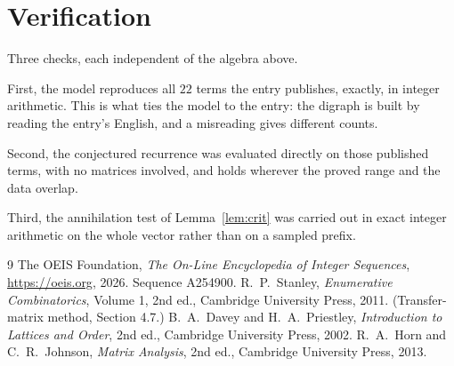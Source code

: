 \documentclass[11pt,a4paper]{article}
\theoremstyle{plain}
\theoremstyle{definition}
\begin{document}
\section{Verification}

Three checks, each independent of the algebra above.

First, the model reproduces all $22$ terms the entry publishes, exactly, in integer
arithmetic. This is what ties the model to the entry: the digraph is built by reading the
entry's English, and a misreading gives different counts.

Second, the conjectured recurrence was evaluated directly on those published terms, with no
matrices involved, and holds wherever the proved range and the data overlap.

Third, the annihilation test of Lemma~\ref{lem:crit} was carried out in exact integer
arithmetic on the whole vector rather than on a sampled prefix.

\begin{thebibliography}{9}
 The OEIS Foundation, \emph{The On-Line Encyclopedia of Integer
Sequences}, \url{https://oeis.org}, 2026. Sequence A254900.
 R.~P.~Stanley, \emph{Enumerative Combinatorics}, Volume 1, 2nd ed.,
Cambridge University Press, 2011. (Transfer-matrix method, Section 4.7.)
 B.~A.~Davey and H.~A.~Priestley, \emph{Introduction to Lattices and
Order}, 2nd ed., Cambridge University Press, 2002.
 R.~A.~Horn and C.~R.~Johnson, \emph{Matrix Analysis}, 2nd ed., Cambridge
University Press, 2013.
\end{thebibliography}
\end{document}
